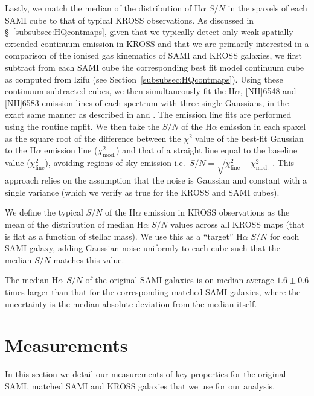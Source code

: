 \documentclass[a4paper,fleqn,usenatbib]{mnras}
\begin{document}
Lastly, we match the median of the distribution of H$\alpha$ $S/N$ in the spaxels of each SAMI cube to that of typical KROSS observations. As discussed in \S~\ref{subsubsec:HQcontmaps}, given that we typically detect only weak spatially-extended continuum emission in KROSS and that we are primarily interested in a comparison of the ionised gas kinematics of SAMI and KROSS galaxies, we first subtract from each SAMI cube the corresponding best fit model continuum cube as computed from {\sc lzifu} (see Section~\ref{subsubsec:HQcontmaps}). Using these continuum-subtracted cubes, we then simultaneously fit the H$\alpha$, [N{\small II}]6548 and [N{\small II}]6583 emission lines of each spectrum with three single Gaussians, in the exact same manner as described in \citet{Stott:2016} and \citet{Tiley:2016}. The emission line fits are performed using the routine {\sc mpfit}. We then take the $S/N$ of the H$\alpha$ emission in each spaxel as the square root of the difference between the $\chi^{2}$ value of the best-fit Gaussian to the H$\alpha$ emission line ($\chi^{2}_{\text{mod.}}$) and that of a straight line equal to the baseline value ($\chi^{2}_{\text{line}}$), avoiding regions of sky emission i.e.\ $ S/N = \sqrt{\chi^{2}_{\text{line}}-\chi^{2}_{\text{mod.}}}$ \citep[e.g.][]{Neyman:1933,Bollen:1989,Labatie:2012}. This approach relies on the assumption that the noise is Gaussian and constant with a single variance (which we verify as true for the KROSS and SAMI cubes).

We define the typical $S/N$ of the H$\alpha$ emission in KROSS observations as the mean of the distribution of median H$\alpha$ $S/N$ values across all KROSS maps (that is flat as a function of stellar mass). We use this as a ``target'' H$\alpha$ $S/N$ for each SAMI galaxy, adding Gaussian noise uniformly to each cube such that the median $S/N$ matches this value. 

The median H$\alpha$ $S/N$ of the original SAMI galaxies is on median average $1.6\pm0.6$ times larger than that for the corresponding matched SAMI galaxies, where the uncertainty is the median absolute deviation from the median itself. 


\section{Measurements}
\label{sec:measurements}

In this section we detail our measurements of key properties for the original SAMI, matched SAMI and KROSS galaxies that we use for our analysis.
\end{document}
